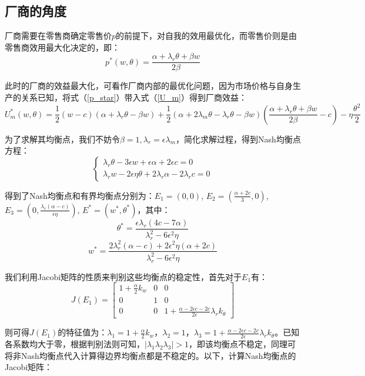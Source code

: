 \documentclass{article}
\begin{document}
\subsection{厂商的角度}
\par 厂商需要在零售商确定零售价$p$的前提下，对自我的效用最优化，而零售价则是由零售商效用最大化决定的，即：
\begin{equation}\label{p_star}
    p^*(w,\theta)=\frac{\alpha+\lambda_r\theta+\beta w}{2\beta}
\end{equation}
\par 此时的厂商的效益最大化，可看作厂商内部的最优化问题，因为市场价格与自身生产的关系已知，将式（\ref{p_star}）带入式（\ref{U_m}）得到厂商效益：
\begin{equation}
    U_m^*(w,\theta)=\frac{1}{2}(w-c)(\alpha+\lambda_r\theta-\beta w)+\frac{1}{2}(\alpha+2\lambda_m\theta-\lambda_r\theta-\beta w)(\frac{\alpha+\lambda_r\theta+\beta w}{2\beta}-c)-\eta\frac{\theta^2}{2}
\end{equation}
\par 为了求解其均衡点，我们不妨令$\beta=1, \lambda_r=\epsilon\lambda_m$，简化求解过程，得到Nash均衡点方程：
\begin{equation}  
    \left\{  
        \begin{array}{lr}
            \lambda_r\theta-3\epsilon w+\epsilon\alpha+2\epsilon c=0               \\  
            \lambda_rw-2\epsilon\eta\theta+2\lambda_r\alpha-2\lambda_rc=0   
        \end{array}  
    \right. 
\end{equation} 
\par 得到了Nash均衡点和有界均衡点分别为：$E_1=(0,0)$, $E_2=(\frac{\alpha+2c}{3},0)$, $E_3=(0,\frac{\lambda_r(\alpha-c)}{\epsilon\eta})$, $E^*=(w^*,\theta^*)$，其中：
$$\theta^*=\frac{\epsilon\lambda_r(4c-7\alpha)}{\lambda_r^2-6\epsilon^2\eta}$$
$$w^*=\frac{2\lambda_r^2(\alpha-c)+2\epsilon^2\eta(\alpha+2c)}{\lambda_r^2-6\epsilon^2\eta}$$
\par 我们利用Jacobi矩阵的性质来判别这些均衡点的稳定性，首先对于$E_1$有：
\begin{equation}
    J(E_1)=
    \left[
    \begin{array}{ccc}
        1+\frac{\alpha}{2}k_w&0&0\\
        0&1&0\\
        0&0&1+\frac{\alpha-2\epsilon c-2c}{2\epsilon}\lambda_rk_\theta
    \end{array}
    \right]
\end{equation}
\par 则可得$J(E_1)$的特征值为：$\lambda_1=1+\frac{\alpha}{2}k_w$，$\lambda_2=1$，$\lambda_3=1+\frac{\alpha-2\epsilon c-2c}{2\epsilon}\lambda_rk_\theta$。已知各系数均大于零，根据判别法则可知，$|\lambda_1\lambda_2\lambda_3|>1$，即该均衡点不稳定，同理可将非Nash均衡点代入计算得边界均衡点都是不稳定的。以下，计算Nash均衡点的Jacobi矩阵：
\end{document}
